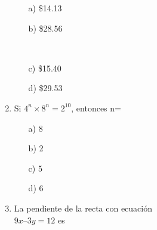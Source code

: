 \documentclass[10.5pt,letterpaper]{article}
\begin{document}
\begin{multicols}{2}
\begin{enumerate}
\begin{minipage}{0.3\linewidth}
\begin{enumerate}
\item[a)] \$14.13
\end{enumerate}
\end{minipage}
\begin{minipage}{0.3\linewidth}
\begin{enumerate}
\item[b)] \$28.56
\end{enumerate}
\end{minipage}\\
\begin{minipage}{0.3\linewidth}
\begin{enumerate}
\item[c)] \$15.40
\end{enumerate}
\end{minipage}
\begin{minipage}{0.3\linewidth}
\begin{enumerate}
\item[d)] \$29.53
\end{enumerate}
\end{minipage}
\item Si $4^n \times 8^n = 2^{10}$, entonces n=\\
\begin{minipage}{0.23\linewidth}
\begin{enumerate}
\item[a)] 8
\end{enumerate}
\end{minipage}
\begin{minipage}{0.23\linewidth}
\begin{enumerate}
\item[b)] 2
\end{enumerate}
\end{minipage}
\begin{minipage}{0.23\linewidth}
\begin{enumerate}
\item[c)] 5
\end{enumerate}
\end{minipage}
\begin{minipage}{0.23\linewidth}
\begin{enumerate}
\item[d)] 6
\end{enumerate}
\end{minipage}
\item La pendiente de la recta con ecuación \\$9x–3y=12$ es\\

\end{enumerate}
\end{multicols}
\end{document}
